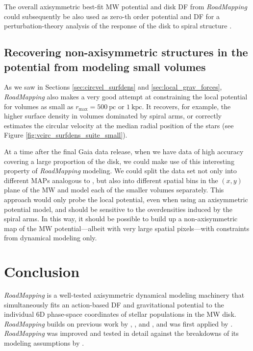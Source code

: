 \documentclass[iop,revtex4,numberedappendix,appendixfloats]{emulateapj}
\newcommand{\RM}{{\sl RoadMapping}}
\begin{document}
The overall axisymmetric best-fit MW potential and disk DF from \RM{} could subsequently be also used as zero-th order potential and DF for a perturbation-theory analysis of the response of the disk to spiral structure \citep{2016MNRAS.457.2569M}.

\subsection{Recovering non-axisymmetric structures in the potential from modeling small volumes}

As we saw in Sections \ref{sec:circvel_surfdens} and \ref{sec:local_grav_forces}, \RM{} also makes a very good attempt at constraining the local potential for volumes as small as $r_\text{max}=500~\text{pc}$ or $1~\text{kpc}$. It recovers, for example, the higher surface density in volumes dominated by spiral arms, or correctly estimates the circular velocity at the median radial position of the stars (see Figure \ref{fig:vcirc_surfdens_suite_small}). 

At a time after the final Gaia data release, when we have data of high accuracy covering a large proportion of the disk, we could make use of this interesting property of \RM{} modeling. We could split the data set not only into different MAPs analogous to \citet{2013ApJ...779..115B}, but also into different spatial bins in the $(x,y)$ plane of the MW and model each of the smaller volumes separately. This approach would only probe the local potential, even when using an axisymmetric potential model, and should be sensitive to the overdensities induced by the spiral arms. In this way, it should be possible to build up a non-axisymmetric map of the MW potential---albeit with very large spatial pixels---with constraints from dynamical modeling only.

\section{Conclusion} \label{sec:conclusion}

\RM{} is a well-tested axisymmetric dynamical modeling machinery that simultaneously fits an action-based DF and gravitational potential to the individual 6D phase-space coordinates of stellar populations in the MW disk. \RM{} builds on previous work by \citet{2011MNRAS.413.1889B}, \citet{2012MNRAS.426.1324B}, and \citet{2015ApJS..216...29B}, and was first applied by \citet{2013ApJ...779..115B}. \RM{} was improved and tested in detail against the breakdowns of its modeling assumptions by \citet{2016ApJ...830...97T}. 
\end{document}
